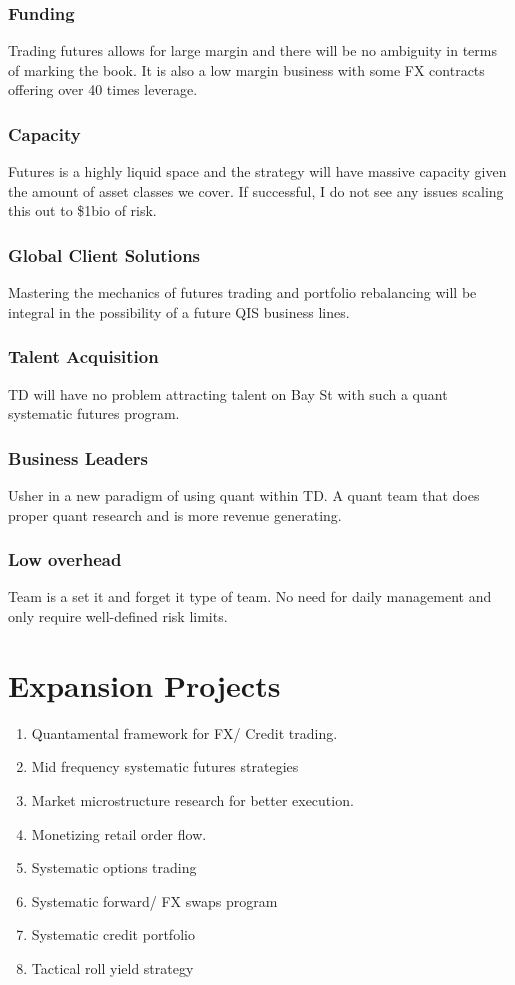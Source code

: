\documentclass{article}
\begin{document}
\subsubsection{Funding}
Trading futures allows for large margin and there will be no ambiguity in terms of marking the book. It is also a low margin business with some FX contracts offering over 40 times leverage.

\subsubsection{Capacity}
Futures is a highly liquid space and the strategy will have massive capacity given the amount of asset classes we cover. If successful, I do not see any issues scaling this out to \$1bio of risk.

\subsubsection{Global Client Solutions}
Mastering the mechanics of futures trading and portfolio rebalancing will be integral in the possibility of a future QIS business lines.

\subsubsection{Talent Acquisition}
TD will have no problem attracting talent on Bay St with such a quant systematic futures program.

\subsubsection{Business Leaders}
Usher in a new paradigm of using quant within TD. A quant team that does proper quant research and is more revenue generating. 

\subsubsection{Low overhead}
Team is a set it and forget it type of team. No need for daily management and only require well-defined risk limits. 







\section{Expansion Projects}
\begin{enumerate}
\item Quantamental framework for FX/ Credit trading.
\item Mid frequency systematic futures strategies
\item Market microstructure research for better execution.
\item Monetizing retail order flow.
\item Systematic options trading
\item Systematic forward/ FX swaps program
\item Systematic credit portfolio
\item Tactical roll yield strategy
\end{enumerate}
\end{document}
